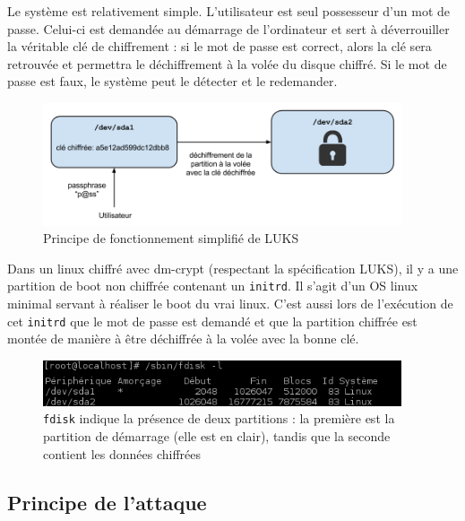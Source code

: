 \documentclass[12pt,a4paper]{article}
\begin{document}
Le système est relativement simple. L'utilisateur est seul possesseur d'un mot de passe. Celui-ci est demandée au démarrage de l'ordinateur et sert à déverrouiller la véritable clé de chiffrement : si le mot de passe est correct, alors la clé sera retrouvée et permettra le déchiffrement à la volée du disque chiffré. Si le mot de passe est faux, le système peut le détecter et le redemander.

\begin{figure}[H]
	\centering
        
	\includegraphics[width=400px]{img/luks_principe.png}
	\caption{Principe de fonctionnement simplifié de LUKS}
\end{figure}

Dans un linux chiffré avec dm-crypt (respectant la spécification LUKS), il y a une partition de boot non chiffrée contenant un \texttt{initrd}. Il s'agit d'un OS linux minimal servant à réaliser le boot du vrai linux. C'est aussi lors de l'exécution de cet \texttt{initrd} que le mot de passe est demandé et que la partition chiffrée est montée de manière à être déchiffrée à la volée avec la bonne clé.

\begin{figure}[H]
	\centering
	\includegraphics[width=400px]{img/luks_fdisk.png}
	\caption{\texttt{fdisk} indique la présence de deux partitions : la première est la partition de démarrage (elle est en clair), tandis que la seconde contient les données chiffrées}
\end{figure}

\subsection{Principe de l'attaque}
\end{document}
